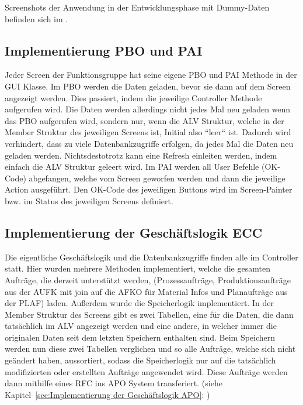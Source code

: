 Screenshots der Anwendung in der Entwicklungsphase mit Dummy-Daten befinden sich im .

\subsection{Implementierung PBO und PAI}
\label{sec:Implementierung PBO und PAI}
Jeder Screen der Funktionsgruppe hat seine eigene \ac{PBO} und \ac{PAI} Methode in der GUI Klasse. Im PBO werden die Daten geladen, bevor sie dann auf dem Screen angezeigt werden. Dies passiert, indem die jeweilige Controller Methode aufgerufen wird. Die Daten werden allerdings nicht jedes Mal neu geladen wenn das \ac{PBO} aufgerufen wird, sondern nur, wenn die ALV Struktur, welche in der Member Struktur des jeweiligen Screens ist, Initial also ``leer`` ist. Dadurch wird verhindert, dass zu viele Datenbankzugriffe erfolgen, da jedes Mal die Daten neu geladen werden. Nichtsdestotrotz kann eine Refresh einleiten werden, indem einfach die \ac{ALV} Struktur geleert wird. Im \ac{PAI} werden all User Befehle (OK-Code) abgefangen, welche vom Screen geworfen werden und dann die jeweilige Action ausgeführt. Den OK-Code des jeweiligen Buttons wird im Screen-Painter bzw. im Status des jeweiligen Screens definiert.

\subsection{Implementierung der Geschäftslogik ECC}
\label{sec:Implementierung der Geschäftslogik ECC}
Die eigentliche Geschäftslogik und die Datenbankzugriffe finden alle im Controller statt. Hier wurden mehrere Methoden implementiert, welche die gesamten Aufträge, die derzeit unterstützt werden, (Prozessaufträge, Produktionsaufträge aus der AUFK mit join auf die AFKO für Material Infos und Planaufträge aus der PLAF) laden. Außerdem wurde die Speicherlogik implementiert. In der Member Struktur des Screens gibt es zwei Tabellen, eine für die Daten, die dann tatsächlich im \ac{ALV} angezeigt werden und eine andere, in welcher immer die originalen Daten seit dem letzten Speichern enthalten sind. Beim Speichern werden nun diese zwei Tabellen verglichen und so alle Aufträge, welche sich nicht geändert haben, aussortiert, sodass die Speicherlogik nur auf die tatsächlich modifizierten oder erstellten Aufträge angewendet wird. Diese Aufträge werden dann mithilfe eines RFC ins \ac{APO} System transferiert. (siehe Kapitel~\ref{sec:Implementierung der Geschäftslogik APO}: )     


